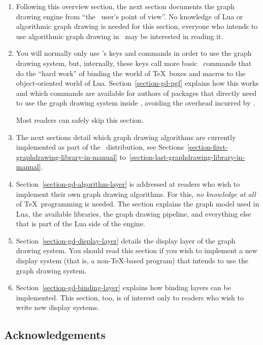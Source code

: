 \begin{enumerate}
    \item Following this overview section, the next section documents the graph
        drawing engine from ``the \tikzname\ user's point of view''. No
        knowledge of Lua or algorithmic graph drawing is needed for this
        section, everyone who intends to use algorithmic graph drawing in
        \tikzname\ may be interested in reading it.
    \item You will normally only use \tikzname's keys and commands in order to
        use the graph drawing system, but, internally, these keys call more
        basic \pgfname\ commands that do the ``hard work'' of binding the world
        of \TeX\ boxes and macros to the object-oriented world of Lua.
        Section~\ref{section-gd-pgf} explains how this works and which commands
        are available for authors of packages that directly need to use the
        graph drawing system inside \pgfname, avoiding the overhead incurred by
        \tikzname.

        Most readers can safely skip this section.
    \item The next sections detail which graph drawing algorithms are currently
        implemented as part of the \tikzname\ distribution, see
        Sections~\ref{section-first-graphdrawing-library-in-manual}
        to~\ref{section-last-graphdrawing-library-in-manual}.
    \item Section~\ref{section-gd-algorithm-layer} is addressed at readers who
        wish to implement their own graph drawing algorithms. For this,
        \emph{no knowledge at all} of \TeX\ programming is needed. The section
        explains the graph model used in Lua, the available libraries, the
        graph drawing pipeline, and everything else that is part of the Lua
        side of the engine.
    \item Section~\ref{section-gd-display-layer} details the display layer of
        the graph drawing system. You should read this section if you wish to
        implement a new display system (that is, a non-\TeX-based program) that
        intends to use the graph drawing system.
    \item Section~\ref{section-gd-binding-layer} explains how binding layers
        can be implemented. This section, too, is of interest only to readers
        who wish to write new display systems.
\end{enumerate}


\subsection{Acknowledgements}

